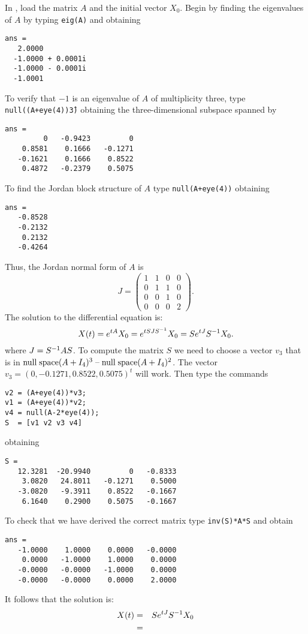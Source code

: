 \documentclass{ximera}
\begin{document}
\begin{computerExercise}
\begin{solution}
\soln  In \Matlabp, load the matrix $A$ and the
initial vector $X_0$.  Begin by finding the eigenvalues of $A$ by typing 
{\tt eig(A)} and obtaining
\begin{verbatim}
ans =
   2.0000          
  -1.0000 + 0.0001i
  -1.0000 - 0.0001i
  -1.0001   
\end{verbatim}
To verify that $-1$ is an eigenvalue of $A$ of multiplicity three, type
{\tt null((A+eye(4))\^3)} obtaining the three-dimensional subspace spanned by
\begin{verbatim}
ans =
         0   -0.9423         0
    0.8581    0.1666   -0.1271
   -0.1621    0.1666    0.8522
    0.4872   -0.2379    0.5075
\end{verbatim}
To find the Jordan block structure of $A$ type {\tt null(A+eye(4))} obtaining
\begin{verbatim}
ans =
   -0.8528
   -0.2132
    0.2132
   -0.4264
\end{verbatim}
Thus, the Jordan normal form of $A$ is 
\[
J = \left(\begin{array}{rrrr} 1 & 1 & 0 & 0\\ 0 & 1 & 1 & 0\\ 0 & 0 & 1 & 0\\
0 & 0 & 0 & 2 \end{array}\right).
\]
The solution to the differential equation is:
\[
X(t) = e^{tA}X_0 = e^{tSJS^{-1}}X_0= Se^{tJ}S^{-1} X_0.
\]
where $J=S^{-1} AS$.  To compute the matrix $S$ we need to choose a vector 
$v_3$ that is in ${\rm null\;space}(A+I_4)^3\;\mbox{--}\;{\rm null\;space}(A+I_4)^2$.  The vector 
$v_3 = (0, -0.1271, 0.8522, 0.5075)^t$ will work. Then type the commands
\begin{verbatim}
v2 = (A+eye(4))*v3;
v1 = (A+eye(4))*v2;
v4 = null(A-2*eye(4));
S  = [v1 v2 v3 v4]
\end{verbatim}
obtaining
\begin{verbatim}
S =
   12.3281  -20.9940         0   -0.8333
    3.0820   24.8011   -0.1271    0.5000
   -3.0820   -9.3911    0.8522   -0.1667
    6.1640    0.2900    0.5075   -0.1667
\end{verbatim}
To check that we have derived the correct matrix type {\tt inv(S)*A*S}
and obtain
\begin{verbatim}
ans =
   -1.0000    1.0000    0.0000   -0.0000
    0.0000   -1.0000    1.0000    0.0000
   -0.0000   -0.0000   -1.0000    0.0000
   -0.0000   -0.0000    0.0000    2.0000
\end{verbatim}
It follows that the solution is:
\begin{eqnarray*}
X(t) & = & Se^{tJ}S\inv X_0 \\ & = & 

\end{eqnarray*}
\end{solution}
\end{computerExercise}
\end{document}

